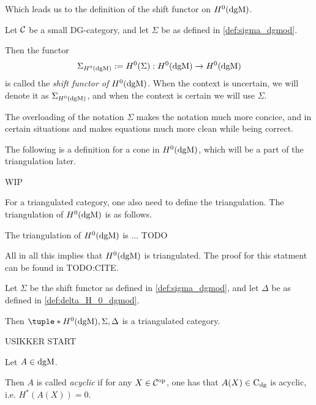Which leads us to the definition of the shift functor on \( H^0(\operatorname{dgM}) \).

\begin{definition}
    \label{def:sigma_h_0_dgmod}
    Let \( {\mathcal{C}} \) be a small DG-category, and let \( \Sigma \) be as defined in \autoref{def:sigma_dgmod}.

    Then the functor
    \[
        \Sigma_{H^0(\operatorname{dgM})} := H^0(\Sigma): H^0(\operatorname{dgM}) \to H^0(\operatorname{dgM})
    \]
    is called the \emph{shift functor of \( H^0(\operatorname{dgM}) \)}. When the context is uncertain, we will denote it as \( \Sigma_{H^0(\operatorname{dgM})} \), and when the context is certain we will use \( \Sigma \).
\end{definition}

The overloading of the notation \( \Sigma \) makes the notation much more concice, and in certain situations and makes equations much more clean while being correct.

The following is a definition for a cone in \( H^0(\operatorname{dgM}) \), which will be a part of the triangulation later.

\begin{definition}
    WIP
\end{definition}

For a triangulated category, one also need to define the triangulation. The triangulation of \( H^0(\operatorname{dgM}) \) is as follows.
\begin{definition}
    \label{def:delta_H_0_dgmod}
    The triangulation of \( H^0(\operatorname{dgM}) \) is ... TODO
\end{definition}

All in all this implies that \( H^0(\operatorname{dgM}) \) is triangulated. The proof for this statment can be found in TODO:CITE.
\begin{theorem}
    Let \( \Sigma \) be the shift functor as defined in \autoref{def:sigma_dgmod}, and let \( \Delta \) be as defined in \autoref{def:delta_H_0_dgmod}.

    Then \( \tuple*{H^0(\dgM), \Sigma, \Delta} \) is a triangulated category.
\end{theorem}

USIKKER START

\begin{definition}
    Let \( A \in \operatorname{dgM} \).

    Then \( A \) is called \emph{acyclic} if for any \( X \in {\mathcal{C}}^{\operatorname{op}} \), one has that \( A(X) \in \operatorname{C}_{\operatorname{dg}} \) is acyclic, i.e. \( H^*(A(X)) = 0 \).
\end{definition}

